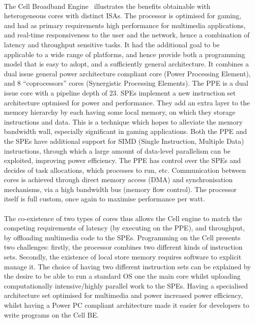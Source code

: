 \paragraph{} The Cell Broadband Engine~\cite{kahle2005cell} illustrates the benefits obtainable with heterogeneous
cores with distinct ISAs. The processor is optimised for gaming, and had as primary 
requirements high performance for multimedia applications, and real-time
responsiveness to the user and the network, hence a combination of 
latency and throughput sensitive tasks. It had the additional goal 
to be applicable to a wide range of platforms, and hence provide 
both a programming model that is easy to adopt, and a sufficiently
general architecture. It combines a dual issue general power architecture 
compliant core (Power Processing Element), and 8 ``coprocessors''
cores (Synergistic Processing Elements).  The PPE is a dual issue core with a 
pipeline depth of 23. SPEs implement a new instruction set
architecture optmised for power and performance. They add an extra layer
to the memory hierarchy by each having some local memory, on which they storage instructions and data.  This is a technique
which hopes to alleviate the memory bandwidth wall, especially significant in
gaming applications. Both the PPE and the SPEs have
additional support for SIMD (Single Instruction, Multiple Data) instructions, through
which a large amount of data-level parallelism can be exploited, improving
power efficiency. The PPE has control over the SPEs and decides of task allocations,
 which processes to run, etc. Communication between cores is achieved 
through direct memory access (DMA) and synchronisation
mechanisms, via a high bandwidth bus (memory flow control). The processor itself is full 
custom, once again to maximise performance per watt. 

\paragraph{} The co-existence of two types of cores thus allows the Cell engine to match
the competing requirements of latency (by executing on the PPE),
and throughput, by offloading multimedia code to the SPEs. 
Programming on the Cell presents two challenges: firstly, the processor
combines two different kinds of instruction sets. Secondly, the existence of 
local store memory requires software to explicit manage it. 
The choice of having two different instruction sets can be explained 
by the desire to be able to run a standard OS one the main 
core whilst uploading computationally intensive/highly parallel work 
to the SPEs. Having a specialised architecture set optimised for multimedia
 and power increased power efficiency, whilst having a Power PC compliant 
architecture made it easier for developers to write programs on the Cell BE.  

